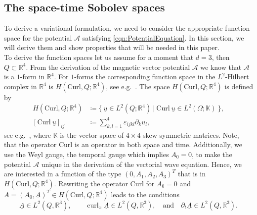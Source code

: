 \documentclass[a4paper,11pt]{article}
\newcommand{\R}{\mathbb R}
\newcommand{\cu}{\operatorname{curl}}
\renewcommand{\vec}[1]{\underline{#1}}
\begin{document}
\subsection{The space-time  Sobolev spaces}
To derive a variational formulation, we need to consider the appropriate  function space for  the potential $\mathcal A$ satisfying \eqref{eqn:PotentialEquation}. In this section, we will derive them and show properties that will be needed in this paper.\\
To derive the  function spaces let us assume for a moment that $d=3$, then $Q\subset \R^4$. From the derivation of the magnetic vector potential $\mathcal A$ we know that $\mathcal A$ is a $1$-form in $\R^4$. For $1$-forms the corresponding  function space in the $L^2$-Hilbert complex in $\R^4$  is $ H(\mathrm{Curl},Q;\R^4)$, see e.g.~\cite{4DDeRham}. The space $ H(\mathrm{Curl},Q;\R^4)$ is defined by
\begin{align*}
	H(\mathrm{Curl},Q;\R^4) &\coloneqq \lbrace \ \vec u\in L^2(Q;\R^4)\ |\ \mathrm{Curl}\ \vec u \in L^2(\Omega;\mathbb{K}) \ \rbrace,\\
	[\mathrm{Curl}\ \vec u]_{ij} &\coloneqq \sum_{k,l=1}^4 \varepsilon_{ijkl}\partial_ku_l,
\end{align*}
see e.g.~\cite{4DDeRham},  where $\mathbb{K}$ is the vector space of $4\times 4$ skew symmetric matrices. Note, that the operator $\mathrm{Curl}$ is an operator in both space and time. Additionally, we use the Weyl gauge, the temporal gauge which implies $A_0=0$, to make the potential $\mathcal A$ unique in the derivation of the vectorial wave equation. Hence, we are interested in a function of the type $(0,A_1,A_2,A_3)^T$ that is in $H(\mathrm{Curl},Q;\R^4)$. Rewriting the operator $\mathrm{Curl}$ for $A_0=0$ and $A = (A_0,\underline{A})^T\in H(\mathrm{Curl},Q;\R^4)$ leads to the conditions
\begin{equation}
	\label{def:FuncCond}
	\underline{A}\in L^2(Q,\R^3),\qquad
	\cu_x\underline{A}\in L^2(Q,\R^3),\quad \text{and}\quad
	\partial_t\underline{A}\in L^2(Q,\R^3).
\end{equation}
\end{document}
